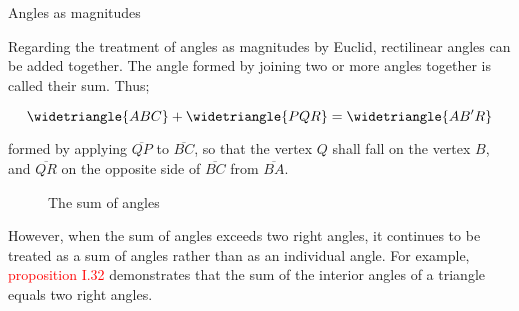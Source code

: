 \begin{subdefin}
Angles as magnitudes
\end{subdefin}

Regarding the treatment of angles as magnitudes by Euclid, rectilinear angles can be added together. The angle formed by joining two or more angles together is called their sum. Thus;



\[\widetriangle{ABC} + \widetriangle{PQR} = \widetriangle{AB^{\prime}R}\]

 formed by applying $\overline{QP}$ to $\overline{BC}$, so that the vertex $Q$ shall fall on the vertex $B$, and $\overline{QR}$ on the opposite side of $\overline{BC}$ from $\overline{BA}$.
 

 \begin{figure}[h]
 	\centering
		\begin{subfigure}{0.25\textwidth}
		\end{subfigure}
		\begin{subfigure}{0.25\textwidth}
		\end{subfigure}
		\begin{subfigure}{0.25\textwidth}
		\end{subfigure}
		\caption{The sum of angles}
\end{figure}

 

However, when the sum of angles exceeds two right angles, it continues to be treated as a sum of angles rather than as an individual angle. For example, \textcolor{red}{proposition I.32} demonstrates that the sum of the interior angles of a triangle equals two right angles.

